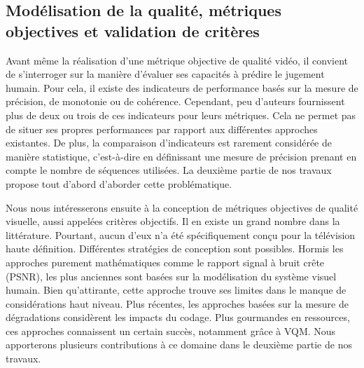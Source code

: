 

\subsection*{Modélisation de la qualité, métriques objectives et validation de critères}
Avant même la réalisation d'une métrique objective de qualité vidéo, il convient de s'interroger sur la manière d'évaluer ses capacités à prédire le jugement humain. Pour cela, il existe des indicateurs de performance basés sur la mesure de précision, de monotonie ou de cohérence. Cependant, peu d'auteurs fournissent plus de deux ou trois de ces indicateurs pour leurs métriques. Cela ne permet pas de situer ses propres performances par rapport aux différentes approches existantes. De plus, la comparaison d'indicateurs est rarement considérée de manière statistique, c'est-à-dire en définissant une mesure de précision prenant en compte le nombre de séquences utilisées. La deuxième partie de nos travaux propose tout d'abord d'aborder cette problématique. %

Nous nous intéresserons ensuite à la conception de métriques objectives de qualité visuelle, aussi appelées critères objectifs. Il en existe un grand nombre dans la littérature. Pourtant, aucun d'eux n'a été spécifiquement conçu pour la télévision haute définition. Différentes stratégies de conception sont possibles. Hormis les approches purement mathématiques comme le rapport signal à bruit crête (PSNR), les plus anciennes sont basées sur la modélisation du système visuel humain. Bien qu'attirante, cette approche trouve ses limites dans le manque de considérations haut niveau. Plus récentes, les approches basées sur la mesure de dégradations considèrent les impacts du codage. Plus gourmandes en ressources, ces approches connaissent un certain succès, notamment grâce à VQM. Nous apporterons plusieurs contributions à ce domaine dans le deuxième partie de nos travaux.%


